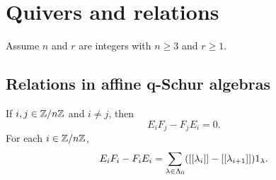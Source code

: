 \documentclass[a4paper, 11pt, twoside]{report}
\begin{document}
\section{Quivers and relations}

Assume $n$ and $r$ are integers with $n\geq 3$ and $r\geq 1$.

\subsection{Relations in affine q-Schur algebras}


\begin{lemma}\label{lemma:q-commutators-E-F}
If $i,j\in\mathbb{Z}/{n \mathbb{Z}}$ and $i\neq j$, then
\begin{equation*}
E_iF_j - F_jE_i = 0.
\end{equation*}
For each $i\in\mathbb{Z}/{n \mathbb{Z}}$,
\begin{equation*}
E_iF_i - F_iE_i = \sum_{\lambda\in\Lambda_0{}} ([[\lambda_i]] - [[\lambda_{i+1}]])1_\lambda.
\end{equation*}
\end{lemma}
\end{document}
